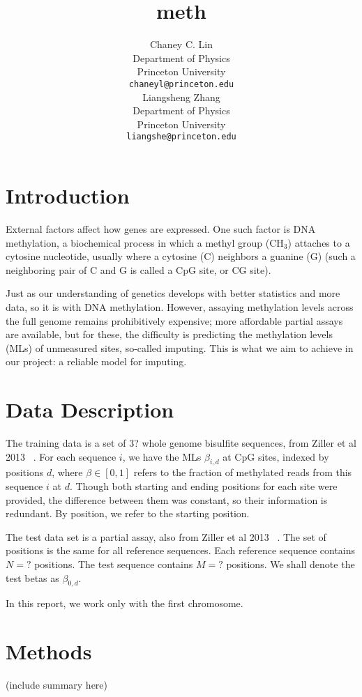 \documentclass{article} %
\title{meth}
\author{
Chaney C. Lin\\
Department of Physics\\
Princeton University\\
\texttt{chaneyl@princeton.edu} \\
\And
Liangsheng Zhang\\
Department of Physics\\
Princeton University\\
\texttt{liangshe@princeton.edu} \\
}
\begin{document}
\maketitle

\begin{abstract}
\end{abstract}
\section{Introduction}

External factors affect how genes are expressed. One such factor is DNA methylation, a biochemical process in which a methyl group (CH$_3$) attaches to a cytosine nucleotide, usually where a cytosine (C) neighbors a guanine (G) (such a neighboring pair of C and G is called a CpG site, or CG site).

Just as our understanding of genetics develops with better statistics and more data, so it is with DNA methylation. However, assaying methylation levels across the full genome remains prohibitively expensive; more affordable partial assays are available, but for these, the difficulty is predicting the methylation levels (MLs) of unmeasured sites, so-called imputing. This is what we aim to achieve in our project: a reliable model for imputing.

\section{Data Description}

The training data is a set of 3? whole genome bisulfite sequences, from Ziller et al 2013 ~\cite{ziller2013charting}. For each sequence $i$, we have the MLs $\beta_{i,d}$ at CpG sites, indexed by positions $d$, where $\beta \in [0,1]$ refers to the fraction of methylated reads from this sequence $i$ at $d$. Though both starting and ending positions for each site were provided, the difference between them was constant, so their information is redundant. By position, we refer to the starting position.

The test data set is a partial assay, also from Ziller et al 2013 ~\cite{ziller2013charting}. The set of positions is the same for all reference sequences. Each reference sequence contains $N=?$ positions. The test sequence contains $M=?$ positions. We shall denote the test betas as $\beta_{0,d}$.

In this report, we work only with the first chromosome.

\section{Methods}
(include summary here)
\end{document}
